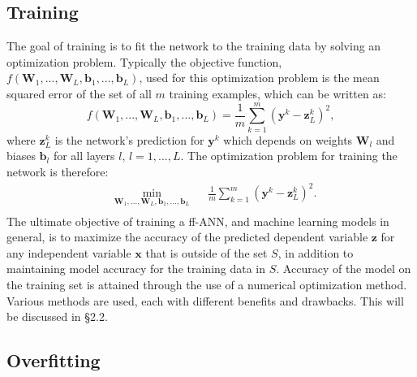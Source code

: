 \documentclass[letterpaper,12pt,titlepage,oneside,final]{book}
\begin{document}
	
	\subsection{Training}
	
	The goal of training is to fit the network to the training data by solving an optimization problem. Typically the objective function, $f(\mathbf{W}_{1},...,\mathbf{W}_{L},\mathbf{b}_{1},...,\mathbf{b}_{L})$, used for this optimization problem is the mean squared error of the set of all $m$ training examples, which can be written as: 
	\begin{equation}
	f(\mathbf{W}_{1},...,\mathbf{W}_{L},\mathbf{b}_{1},...,\mathbf{b}_{L}) = \frac{1}{m}\sum_{k=1}^{m}{(\mathbf{y}^{k} - \mathbf{z}_{L}^{k})^{2}},
	\label{equation:objective_function}
	\end{equation}
	where $\mathbf{z}_{L}^{k}$ is the network's prediction for $\mathbf{y}^{k}$ which depends on weights $\mathbf{W}_{l}$ and biases $\mathbf{b}_{l}$ for all layers $l$, $l=1,...,L$. The optimization problem for training the network is therefore:
	\begin{equation}
	\begin{aligned}
	& \underset{\mathbf{W}_{1},...,\mathbf{W}_{L},\mathbf{b}_{1},...,\mathbf{b}_{L}}{\text{min}}
	& & \frac{1}{m}\sum_{k=1}^{m}{(\mathbf{y}^{k} - \mathbf{z}_{L}^{k})^{2}}.\\
	\end{aligned}
	\label{equation:optimization}
	\end{equation}
	The ultimate objective of training a ff-ANN, and machine learning models in general, is to maximize the accuracy of the predicted dependent variable $\mathbf{z}$ for any independent variable $\mathbf{x}$ that is outside of the set $S$, in addition to maintaining model accuracy for the training data in $S$. Accuracy of the model on the training set is attained through the use of a numerical optimization method. Various methods are used, each with different benefits and drawbacks. This will be discussed in \S{2.2}.
	
	\subsection{Overfitting}
	
\end{document}
